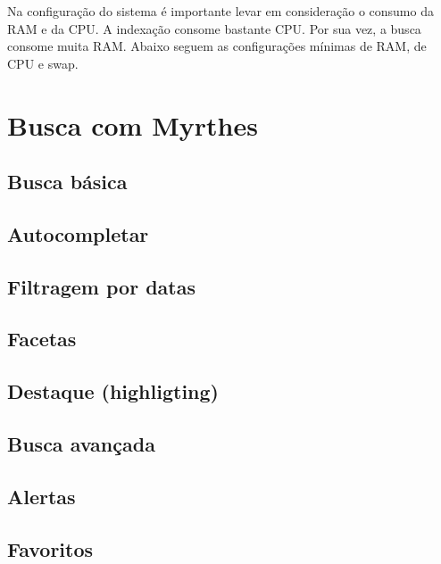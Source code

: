 \documentclass[]{book}
\begin{document}
Na configuração do sistema é importante levar em consideração o consumo da RAM e da CPU. A indexação consome bastante CPU. Por sua vez, a busca consome muita RAM. Abaixo seguem as configurações mínimas de RAM, de CPU e swap.

\hypertarget{busca}{%
\chapter{Busca com Myrthes}\label{busca}}

\hypertarget{busca-basica}{%
\section{Busca básica}\label{busca-basica}}

\hypertarget{autocompletar}{%
\section{Autocompletar}\label{autocompletar}}

\hypertarget{filtragem-por-datas}{%
\section{Filtragem por datas}\label{filtragem-por-datas}}

\hypertarget{facetas}{%
\section{Facetas}\label{facetas}}

\hypertarget{destaque-highligting}{%
\section{Destaque (highligting)}\label{destaque-highligting}}

\hypertarget{busca-avancada}{%
\section{Busca avançada}\label{busca-avancada}}

\hypertarget{alertas}{%
\section{Alertas}\label{alertas}}

\hypertarget{favoritos}{%
\section{Favoritos}\label{favoritos}}
\end{document}
